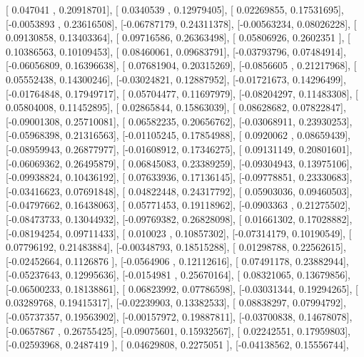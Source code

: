 \documentclass{article}
\begin{document}
       [ 0.047041  ,  0.20918701],
       [ 0.0340539 ,  0.12979405],
       [ 0.02269855,  0.17531695],
       [-0.0053893 ,  0.23616508],
       [-0.06787179,  0.24311378],
       [-0.00563234,  0.08026228],
       [ 0.09130858,  0.13403364],
       [ 0.09716586,  0.26363498],
       [ 0.05806926,  0.2602351 ],
       [ 0.10386563,  0.10109453],
       [ 0.08460061,  0.09683791],
       [-0.03793796,  0.07484914],
       [-0.06056809,  0.16396638],
       [ 0.07681904,  0.20315269],
       [-0.0856605 ,  0.21217968],
       [ 0.05552438,  0.14300246],
       [-0.03024821,  0.12887952],
       [-0.01721673,  0.14296499],
       [-0.01764848,  0.17949717],
       [ 0.05704477,  0.11697979],
       [-0.08204297,  0.11483308],
       [ 0.05804008,  0.11452895],
       [ 0.02865844,  0.15863039],
       [ 0.08628682,  0.07822847],
       [-0.09001308,  0.25710081],
       [ 0.06582235,  0.20656762],
       [-0.03068911,  0.23930253],
       [-0.05968398,  0.21316563],
       [-0.01105245,  0.17854988],
       [ 0.0920062 ,  0.08659439],
       [-0.08959943,  0.26877977],
       [-0.01608912,  0.17346275],
       [ 0.09131149,  0.20801601],
       [-0.06069362,  0.26495879],
       [ 0.06845083,  0.23389259],
       [-0.09304943,  0.13975106],
       [-0.09938824,  0.10436192],
       [ 0.07633936,  0.17136145],
       [-0.09778851,  0.23330683],
       [-0.03416623,  0.07691848],
       [ 0.04822448,  0.24317792],
       [ 0.05903036,  0.09460503],
       [-0.04797662,  0.16438063],
       [ 0.05771453,  0.19118962],
       [-0.0903363 ,  0.21275502],
       [-0.08473733,  0.13044932],
       [-0.09769382,  0.26828098],
       [ 0.01661302,  0.17028882],
       [-0.08194254,  0.09711433],
       [ 0.010023  ,  0.10857302],
       [-0.07314179,  0.10190549],
       [ 0.07796192,  0.21483884],
       [-0.00348793,  0.18515288],
       [ 0.01298788,  0.22562615],
       [-0.02452664,  0.1126876 ],
       [-0.0564906 ,  0.12112616],
       [ 0.07491178,  0.23882944],
       [-0.05237643,  0.12995636],
       [-0.0154981 ,  0.25670164],
       [ 0.08321065,  0.13679856],
       [-0.06500233,  0.18138861],
       [ 0.06823992,  0.07786598],
       [-0.03031344,  0.19294265],
       [ 0.03289768,  0.19415317],
       [-0.02239903,  0.13382533],
       [ 0.08838297,  0.07994792],
       [-0.05737357,  0.19563902],
       [-0.00157972,  0.19887811],
       [-0.03700838,  0.14678078],
       [-0.0657867 ,  0.26755425],
       [-0.09075601,  0.15932567],
       [ 0.02242551,  0.17959803],
       [-0.02593968,  0.2487419 ],
       [ 0.04629808,  0.2275051 ],
       [-0.04138562,  0.15556744],
\end{document}
